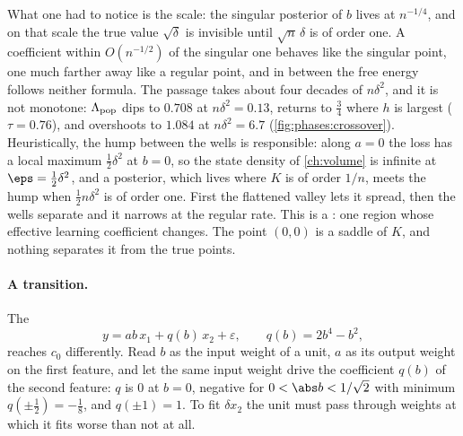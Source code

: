 \begin{refsection}
What one had to notice is the scale: the singular posterior of $b$ lives at $n^{-1/4}$, and on that scale the true value $\sqrt\delta$ is invisible until $\sqrt n\,\delta$ is of order one. A coefficient within $O(n^{-1/2})$ of the singular one behaves like the singular point, one much farther away like a regular point, and in between the free energy follows neither formula. The passage takes about four decades of $n\delta^2$, and it is not monotone: $\Lambda_{\mathrm{pop}}$ dips to $0.708$ at $n\delta^2=0.13$, returns to $\frac34$ where $h$ is largest ($\tau=0.76$), and overshoots to $1.084$ at $n\delta^2=6.7$ (\cref{fig:phases:crossover}). Heuristically, the hump between the wells is responsible: along $a=0$ the loss has a local maximum $\frac12\delta^2$ at $b=0$, so the state density of \cref{ch:volume} is infinite at $\eps=\frac12\delta^2$, and a posterior, which lives where $K$ is of order $1/n$, meets the hump when $\frac12n\delta^2$ is of order one. First the flattened valley lets it spread, then the wells separate and it narrows at the regular rate. This is a : one region whose effective learning coefficient changes. The point $(0,0)$ is a saddle of $K$, and nothing separates it from the true points.

\paragraph{A transition.} The 
\[
y=ab\,x_1+q(b)\,x_2+\varepsilon,\qquad q(b)=2b^4-b^2,
\]
reaches $c_0$ differently. Read $b$ as the input weight of a unit, $a$ as its output weight on the first feature, and let the same input weight drive the coefficient $q(b)$ of the second feature: $q$ is $0$ at $b=0$, negative for $0<\abs b<1/\sqrt2$ with minimum $q(\pm\frac12)=-\frac18$, and $q(\pm1)=1$. To fit $\delta x_2$ the unit must pass through weights at which it fits worse than not at all.


\end{refsection}

